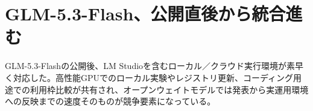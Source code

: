 \section{GLM-5.3-Flash、公開直後から統合進む}
GLM-5.3-Flashの公開後、LM Studioを含むローカル／クラウド実行環境が素早く対応した。高性能GPUでのローカル実験やレジストリ更新、コーディング用途での利用枠比較が共有され、オープンウェイトモデルでは発表から実運用環境への反映までの速度そのものが競争要素になっている。
